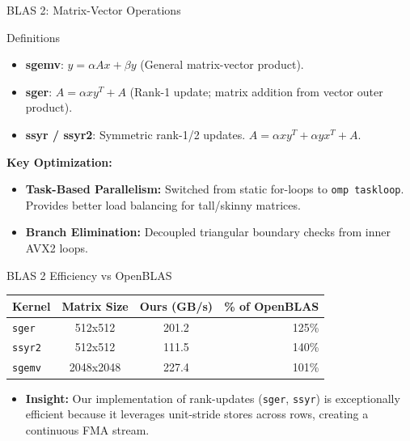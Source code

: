 \documentclass[aspectratio=169]{beamer}
\begin{document}
\begin{frame}{BLAS 2: Matrix-Vector Operations}
  \begin{block}{Definitions}
    \begin{itemize}
      \item \textbf{sgemv}: $y = \alpha Ax + \beta y$ (General matrix-vector product).
      \item \textbf{sger}: $A = \alpha xy^T + A$ (Rank-1 update; matrix addition from vector outer product).
      \item \textbf{ssyr / ssyr2}: Symmetric rank-1/2 updates. $A = \alpha xy^T + \alpha yx^T + A$.
    \end{itemize}
  \end{block}
  \textbf{Key Optimization:}
  \begin{itemize}
    \item \textbf{Task-Based Parallelism:} Switched from static for-loops to \texttt{omp taskloop}. Provides better load balancing for tall/skinny matrices.
    \item \textbf{Branch Elimination:} Decoupled triangular boundary checks from inner AVX2 loops.
  \end{itemize}
\end{frame}

\begin{frame}{BLAS 2 Efficiency vs OpenBLAS}
  \begin{center}
    \begin{tabular}{|l|c|c|r|}
      \hline
      \textbf{Kernel} & \textbf{Matrix Size} & \textbf{Ours (GB/s)} & \textbf{\% of OpenBLAS} \\
      \hline
      \texttt{sger}  & 512x512 & 201.2 & 125\% \\
      \texttt{ssyr2} & 512x512 & 111.5 & 140\% \\
      \texttt{sgemv} & 2048x2048 & 227.4 & 101\% \\
      \hline
    \end{tabular}
  \end{center}
  \begin{itemize}
    \item \textbf{Insight:} Our implementation of rank-updates (\texttt{sger}, \texttt{ssyr}) is exceptionally efficient because it leverages unit-stride stores across rows, creating a continuous FMA stream.
  \end{itemize}
\end{frame}
\end{document}

